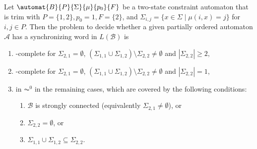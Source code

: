 \begin{theorem} 
\label{constr_sync:thm:input_pto}    
    Let $\automat{B}{P}{\Sigma}{\mu}{p_0}{F}$ be a two-state constraint automaton that is trim
    with $P = \{1,2\}, p_0 = 1, F = \{2\}$, and $\Sigma_{i,j} = \{ x \in \Sigma \mid \mu(i, x) = j \}$
    for $i,j \in P$.
    Then the problem to decide whether a given partially ordered automaton $\mathcal A$
    has a synchronizing word in $L(\mathcal B)$
    is
	\begin{enumerate} 
    \item \NP-complete for $\Sigma_{2,1} = \emptyset$,
    $ %
     ( \Sigma_{1,1} \cup \Sigma_{1,2} ) \setminus \Sigma_{2,2} \ne \emptyset$ and $
       |\Sigma_{2,2}| \ge 2,   
    $
     
     \item \LOGSPACE-complete for $\Sigma_{2,1} = \emptyset$, $(\Sigma_{1,1} \cup \Sigma_{1,2}) \setminus \Sigma_{2,2} \ne \emptyset$ and $|\Sigma_{2,2}| = 1$,  
     
    \item in $\AC^0$ in the remaining cases, which are covered by the following conditions:
    \begin{enumerate}
          
    \item $\mathcal B$ is strongly connected (equivalently $\Sigma_{2,1} \ne \emptyset$), or
    
    \item $\Sigma_{2,2} = \emptyset$, or
        
    \item 	$\Sigma_{1,1} \cup \Sigma_{1,2} \subseteq \Sigma_{2,2}$.
    \end{enumerate}     
	\end{enumerate} 
\end{theorem}
